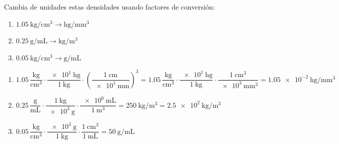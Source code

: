 \begin{exercise}
    Cambia de unidades estas densidades usando factores de conversión:
    \begin{enumerate}[label=\letraminuscula]
        \item \(\qty{1.05}{\kg\per\cubic\cm} \to \unit{\hecto\gram\per\cubic\mm}\)
        \item \(\qty{0.25}{\g\per\mL} \to \unit{\kg\per\cubic\m}\)
        \item \(\qty{0.05}{\kg\per\cubic\cm} \to \unit{\g\per\mL}\)
    \end{enumerate}
    \begin{solu}
        \begin{enumerate}[label=\alph*)]
            \item \(\num{1.05}\,\dfrac{\unit{\kg}}{\unit{\cubic\cm}} \cdot \dfrac{\qty{e1}{\hecto\gram}}{\qty{1}{\kg}} \cdot \left(\dfrac{\qty{1}{\cm}}{\qty{e1}{\mm}}\right)^{3} = \num{1.05}\,\dfrac{\unit{\kg}}{\unit{\cubic\cm}} \cdot \dfrac{\qty{e1}{\hecto\gram}}{\qty{1}{\kg}} \cdot \dfrac{\qty{1}{\cubic\cm}}{\qty{e3}{\cubic\mm}} = \qty{1.05e-2}{\hecto\gram\per\cubic\mm}\)
            \item \(\num{0.25}\,\dfrac{\unit{\g}}{\unit{\mL}} \cdot \dfrac{\qty{1}{\kg}}{\qty{e3}{\g}} \cdot \dfrac{\qty{e6}{\mL}}{\qty{1}{\cubic\m}} = \qty{250}{\kg\per\cubic\m} = \qty{2.5e2}{\kg\per\cubic\m}\)
            \item \(\num{0.05}\,\dfrac{\unit{\kg}}{\unit{\cubic\cm}} \cdot \dfrac{\qty{e3}{\g}}{\qty{1}{\kg}} \cdot \dfrac{\qty{1}{\cubic\cm}}{\qty{1}{\mL}} = \qty{50}{\g\per\mL}\)
        \end{enumerate}
    \end{solu}
\end{exercise}


